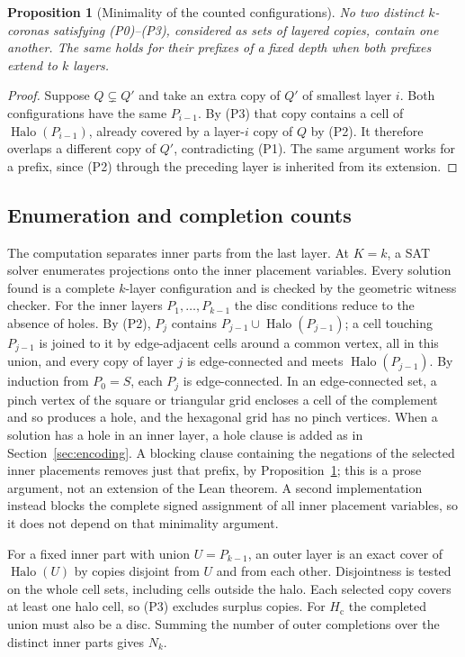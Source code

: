 \documentclass[10pt,a4paper]{article}
\newtheorem{proposition}[theorem]{Proposition}
\theoremstyle{definition}
\theoremstyle{remark}
\newcommand{\Halo}{\operatorname{Halo}}
\newcommand{\Hc}{H_{\mathrm c}}
\begin{document}
\begin{proposition}[Minimality of the counted configurations]
\label{prop:minimal}
No two distinct $k$-coronas satisfying (P0)--(P3), considered as sets of
layered copies, contain one another. The same holds for their prefixes
of a fixed depth when both prefixes extend to $k$ layers.
\end{proposition}
\begin{proof}
Suppose $Q\subsetneq Q'$ and take an extra copy of $Q'$ of smallest
layer $i$. Both configurations have the same $P_{i-1}$. By (P3) that
copy contains a cell of $\Halo(P_{i-1})$, already covered by a layer-$i$
copy of $Q$ by (P2). It therefore overlaps a different copy of $Q'$,
contradicting (P1). The same argument works for a prefix, since (P2)
through the preceding layer is inherited from its extension.
\end{proof}

\subsection{Enumeration and completion counts}
\label{sec:enum}
The computation separates inner parts from the last layer. At $K=k$,
a SAT solver enumerates projections onto the inner placement variables.
Every solution found is a complete $k$-layer configuration and is checked
by the geometric witness checker. For the inner layers $P_1,\dots,P_{k-1}$
the disc conditions reduce to the absence of holes. By (P2), $P_j$
contains $P_{j-1}\cup\Halo(P_{j-1})$; a cell touching $P_{j-1}$ is joined
to it by edge-adjacent cells around a common vertex, all in this union,
and every copy of layer $j$ is edge-connected and meets $\Halo(P_{j-1})$.
By induction from $P_0=S$, each $P_j$ is edge-connected. In an edge-connected set, a pinch
vertex of the square or triangular grid encloses a cell of the
complement and so produces a hole, and the hexagonal grid has no pinch
vertices. When a solution has a hole in an inner layer, a hole clause is
added as in Section~\ref{sec:encoding}. A blocking clause
containing the negations of the selected inner placements removes just
that prefix, by Proposition~\ref{prop:minimal}; this is a prose argument,
not an extension of the Lean theorem. A second implementation instead
blocks the complete signed assignment of all inner placement variables,
so it does not depend on that minimality argument.

For a fixed inner part with union $U=P_{k-1}$, an outer layer is an exact
cover of $\Halo(U)$ by copies disjoint from $U$ and from each other.
Disjointness is tested on the whole cell sets, including cells outside
the halo. Each selected copy covers at least one halo cell, so (P3)
excludes surplus copies. For $\Hc$ the completed union must also be a
disc. Summing the number of outer completions over the distinct inner
parts gives $N_k$.
\end{document}
